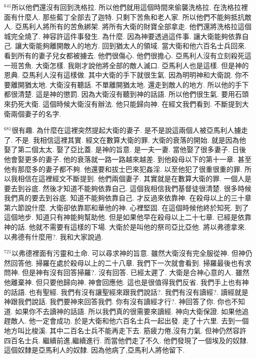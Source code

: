 \documentclass{book}
\begin{document}
$^{641}$所以他們還沒有回到洗格拉.
所以他們就用這個時間來偷襲洗格拉.
在洗格拉裡面有什麼人.
那些藍丁全部去了迦特.
只剩下苦魚和老人家.
所以他們不能夠抵抗敵人.
亞馬利人將所有的苦魚綁架.
將所有大衛的財寶全部拿走.
他們還將洗格拉這個城完全燒了.
神容許這件事發生.
為什麼.
因為神要透過這件事.
讓大衛能夠依靠自己.
讓大衛能夠離開敵人的地方.
回到猶太人的領域.
當大衛和他六百名士兵回來.
看到所有的妻子兒女都被擄去.
他們很傷心.
他們很擔心.
亞馬利人沒有立刻殺死這一班苦魚.
大衛怎樣.
我剛才說他將全部的敵人滅口.
亞馬利人也是這樣.
但是神的恩典.
亞馬利人沒有這樣做.
其中大衛的手下就很生氣.
因為明明神和大衛說.
你不要離開猶太地.
大衛沒有聽話.
不單離開猶太地.
還走到敵人的地方.
所以他的手下都很清楚.
這是神的懲罰.
因為大衛沒有聽到神的話語.
所以他們很生氣.
要用石頭來扔死大衛.
這個時候大衛沒有辦法.
他只能歸向神.
在經文我們看到.
不斷提到大衛兩個妻子的名字.

$^{681}$很有趣.
為什麼在這裡突然提起大衛的妻子.
是不是說這兩個人被亞馬利人擄走了.
不是.
我相信這裡其實.
經文在數算大衛的罪.
大衛的衰落的開始.
就是因為他娶了第二個太太.
娶了亞比蓋.
是神的旨意.
是一夫一妻.
當他娶了很多妻子.
日後他會娶更多的妻子.
他的衰落就一路一路越來越差.
到他殺母以下的第十一章.
甚至他有那麼多的妻子都不夠.
他還要和拔士巴來犯姦淫.
以至他犯了很重很重的罪.
所以我相信在這裡經文不斷提到.
他們兩個妻子.
其實就是在數算大衛的罪.
一個人是要去到谷底.
然後才知道不能夠依靠自己.
這個我相信我們基督徒很清楚.
很多時候我們真的要去到谷底.
知道不能夠依靠自己.
才反過來依靠神.
在殺母以上的三十章第六節說什麼.
大衛卻依靠耶和華他的神.
心裡堅固.
在這個時候他終於知死.
到了這個地步.
知道只有神能夠幫助他.
但是如果他早在殺母以上二十七章.
已經是依靠神的話.
他就不需要有這樣的下場.
大衛於是叫他的祭司亞比亞他.
將以弗德拿來.
以弗德有什麼用?.
我和大家說過.

$^{721}$以弗德裡面有污靈和土命.
可以尋求神的旨意.
雖然大衛沒有完全服從神.
但神仍然回答他.
掃羅在處於殺母以上的二十八章.
我們下一次就會看到.
掃羅最後也有求問神.
但是神有沒有回答掃羅?.
沒有回答.
已經太遲了.
大衛是合神心意的人.
雖然他離棄神.
但只要他歸向神.
神會回應他.
這也是很值得我們反省.
我們手上也有神的話語.
也有聖經.
我們有沒有讓聖經來跟我們說話?.
我們有沒有讀經?.
讀經就是神跟我們說話.
我們要神來回答我們.
你有沒有讀經才行?.
神回答了你.
你也不知道.
如果你不去讀神的話語.
所以我們真的很需要來讀經.
神向大衛保證.
如果他追趕敵人.
他一定會成功.
於是大衛和他六百名士兵一起出發.
走了十六里.
去到一個地方叫比梭溪.
其中二百名士兵不能再走下去.
筋疲力倦,沒有力氣.
但神仍然容許四百名士兵.
繼續前進,繼續進行.
而當他們走了不久.
他們發現了一個埃及的奴隸.
這個奴隸是亞馬利人的奴隸.
因為他病了,亞馬利人將他留下.
\end{document}
